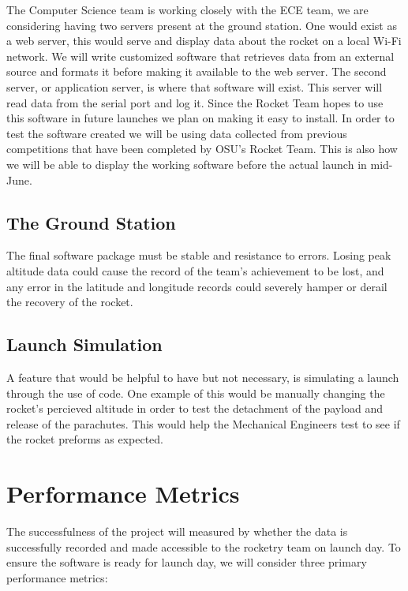 \documentclass[10pt,journal,draftclsnofoot,onecolumn]{IEEEtran}
\begin{document}
The Computer Science team is 
working closely with the ECE team, we are considering having two servers 
present at the ground station. One would exist as a web server, this would
serve and display data about the rocket on a local Wi-Fi network. We will
write customized software that retrieves data from an external source and
formats it before making it available to the web server. The second server,
 or application server, is where that software will exist. This server will
 read data from the serial port and log it. Since the Rocket Team hopes to 
 use this software in future launches we plan on making it easy to install.
 In order to test the software created we will be using data collected from
 previous competitions that have been completed by OSU's Rocket Team. This is
 also how we will be able to display the working software before the actual
 launch in mid-June.

\subsection{The Ground Station}

The final software package must be stable and resistance to errors.
Losing peak altitude data could cause the record of the team's
achievement to be lost, and any error in the latitude
and longitude records could severely hamper or derail
the recovery of the rocket.

\subsection{Launch Simulation}

A feature that would be helpful to have but not necessary, is simulating a launch
through the use of code. One example of this would be manually changing the rocket's 
percieved altitude in order to test the detachment of the payload and release of the
parachutes. This would help the Mechanical Engineers test to see if 
the rocket preforms as expected. 

\section{Performance Metrics}

The successfulness of the project will measured by whether the data
is successfully recorded and made accessible to the rocketry team
on launch day. To ensure the software is ready for launch day,
we will consider three primary performance metrics:
\end{document}
